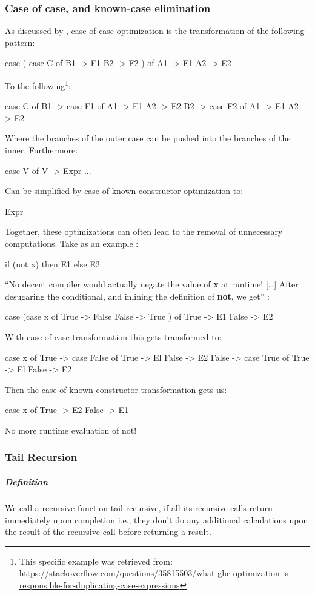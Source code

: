 \subsubsection{Case of case, and known-case elimination}
As discussed by \cite{Jones1996}, case of case optimization is the transformation of the following pattern:
\begin{spec}
case ( 
  case C of 
    B1 -> F1
    B2 -> F2
  ) of
  A1 -> E1
  A2 -> E2
\end{spec}
To the following\footnote{This specific example was retrieved from: \url{https://stackoverflow.com/questions/35815503/what-ghc-optimization-is-responsible-for-duplicating-case-expressions}}:
\begin{spec}
case C of    
  B1 -> case F1 of
    A1 -> E1
    A2 -> E2
  B2 -> case F2 of
    A1 -> E1
    A2 -> E2
\end{spec}
Where the branches of the outer case can be pushed into the branches of the inner.
Furthermore:
\begin{spec}
case V of
  V -> Expr
  ...
\end{spec}
Can be simplified by case-of-known-constructor optimization to:
\begin{spec}
Expr
\end{spec}
Together, these optimizations can often lead to the removal of unnecessary computations. Take as an example \citep{Jones1996}:
\begin{spec}
if (not x) then E1 else E2
\end{spec}
``No decent compiler would actually negate the value of \textbf{x} at runtime! [\ldots] After desugaring the conditional, and inlining the definition of \textbf{not}, we get'' \citep{Jones1996}:
\begin{spec}
case (case x of
  True -> False
  False -> True
) of 
  True -> E1 
  False -> E2
\end{spec}
With case-of-case transformation this gets transformed to:
\begin{spec}
case x of 
  True -> case False of
    True -> El
    False -> E2
  False -> case True of
    True -> El
    False -> E2
\end{spec}
Then the case-of-known-constructor transformation gets us:
\begin{spec}
case x of
  True -> E2
  False -> E1
\end{spec}
No more runtime evaluation of not!

\subsubsection{Tail Recursion}\label{sec:tail}
\subparagraph{Definition}
We call a recursive function tail-recursive, if all its recursive calls return immediately upon completion i.e., they don't do any additional calculations upon the result of the recursive call before returning a result.

